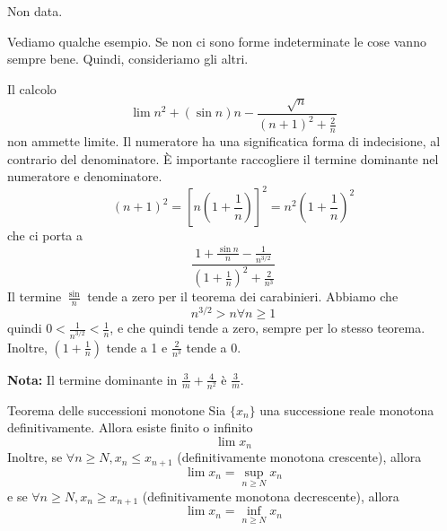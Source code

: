 \documentclass[a4paper]{article}
\begin{document}
\begin{snippetproof}{}
    Non data.
\end{snippetproof}

Vediamo qualche esempio. Se non ci sono forme indeterminate le cose vanno sempre bene. Quindi, consideriamo
gli altri.

\begin{snippetexample}{}
    Il calcolo \[\lim n^2 + (\sin n) n - \frac{\sqrt{n}}{{(n+1)}^2 + \frac{2}{n}}\]
    non ammette limite. Il numeratore ha una significatica forma di indecisione, al contrario del denominatore.
    È importante raccogliere il termine dominante nel numeratore e denominatore.
    \[
        {(n+1)}^2 = {\left[n\left(1+\frac{1}{n}\right)\right]}^2 = n^2{\left(1+\frac{1}{n}\right)}^2
    \]
    che ci porta a
    \[
        \frac{
            1 + \frac{\sin n}{n} - \frac{1}{n^{3/2}}
        }{
            {(1 + \frac{1}{n})}^2 + \frac{2}{n^3}
        }
    \]
    Il termine \(\frac{\sin}{n}\) tende a zero per il teorema dei carabinieri.
    Abbiamo che \[n^{3/2} > n \forall n \geq 1\] quindi \(0 < \frac{1}{n^{3/2}} < \frac{1}{n}\),
    e che quindi tende a zero, sempre per lo stesso teorema.
    Inoltre, \((1 + \frac{1}{n})\) tende a 1 e \(\frac{2}{n^3}\) tende a \(0\).
\end{snippetexample}

\textbf{Nota:} Il termine dominante in \(\frac{3}{m} + \frac{4}{n^2}\) è \(\frac{3}{m}\).

\begin{snippettheorem}{Teorema delle successioni monotone}
    Sia \(\{x_n\}\) una successione reale monotona definitivamente.
    Allora esiste finito o infinito
    \[\lim x_n\]
    Inoltre, se \(\forall n\geq N, x_n \leq x_{n+1}\) (definitivamente monotona crescente),
    allora
    \[
        \lim x_n = \sup_{n \geq N} x_n
    \]
    e se \(\forall n\geq N, x_n \geq x_{n+1}\) (definitivamente monotona decrescente),
    allora
    \[
        \lim x_n = \inf_{n \geq N} x_n
    \]
\end{snippettheorem}
\end{document}
